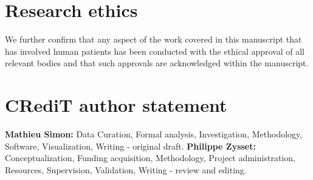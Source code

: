 \documentclass[a4paper,fleqn]{DC_ArtStyle}
\begin{document}
	\section*{Research ethics}
	We further confirm that any aspect of the work covered in this manuscript that has involved human patients has been conducted with the ethical approval of all relevant bodies and that such approvals are acknowledged within the manuscript.
	
	\section*{CRediT author statement}
	\textbf{Mathieu Simon:} Data Curation, Formal analysis, Investigation, Methodology, Software, Visualization, Writing - original draft.
	\textbf{Philippe Zysset:} Conceptualization, Funding acquisition, Methodology, Project administration, Resources, Supervision, Validation, Writing - review and editing.
	

	\nocite{*}
	
	


	


	\clearpage
	\appendix
	
	
\end{document}
